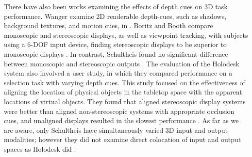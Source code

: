 There have also been works examining the effects of depth cues on 3D task
performance. Wanger \etal examine 2D renderable depth-cues, such as shadows,
background textures, and motion cues, in \cite{wanger1992perceiving}. Boritz and
Booth compare monoscopic and stereoscopic displays, as well as viewpoint
tracking, with subjects using a 6-DOF input device, finding stereoscopic
displays to be superior to monoscopic displays \cite{boritz1997study}. In
contrast, Schultheis \etal found no significant
difference between monoscopic and stereoscopic outputs
\cite{schultheis2012comparison}. The evaluation of the Holodesk
system also involved
a user study, in which they compared performance on a selection task with varying
depth cues. This study
focused on the effectiveness of aligning the location of physical objects in the tabletop
space with the apparent locations of virtual objects. They found that aligned
stereoscopic display systems were better than aligned non-stereoscopic systems
with appropriate occlusion cues, and unaligned displays resulted in the slowest
performance \cite{holodesk}. As far as we are aware, only Schultheis \etal have
simultaneously varied 3D input and output modalities; however they did not
examine direct colocation of input and output spaces as Holodesk did
\cite{schultheis2012comparison}.

